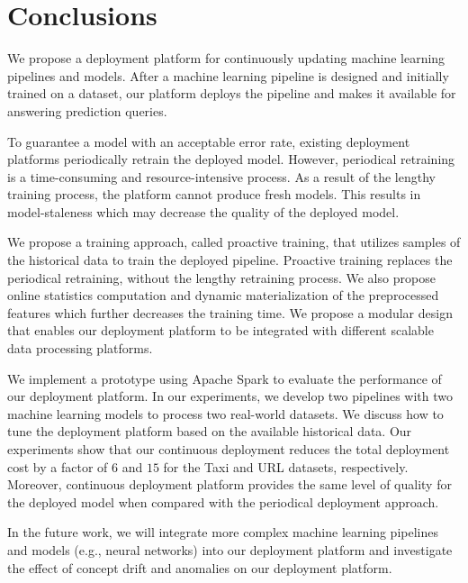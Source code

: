 \section{Conclusions} \label{conclusion}
We propose a deployment platform for continuously updating machine learning pipelines and models.
After a machine learning pipeline is designed and initially trained on a dataset, our platform deploys the pipeline and makes it available for answering prediction queries.

To guarantee a model with an acceptable error rate, existing deployment platforms periodically retrain the deployed model. 
However, periodical retraining is a time-consuming and resource-intensive process.
As a result of the lengthy training process, the platform cannot produce fresh models.
This results in model-staleness which may decrease the quality of the deployed model.

We propose a training approach, called proactive training, that utilizes samples of the historical data to train the deployed pipeline.
Proactive training replaces the periodical retraining,   without the lengthy retraining process.
We also propose online statistics computation and dynamic materialization of the preprocessed features which further decreases the training time.
We propose a modular design that enables our deployment platform to be integrated with different scalable data processing platforms.

We implement a prototype using Apache Spark to evaluate the performance of our deployment platform.
In our experiments, we develop two pipelines with two machine learning models to process two real-world datasets.
We discuss how to tune the deployment platform based on the available historical data.
Our experiments show that our continuous deployment reduces the total deployment cost by a factor of $6$ and $15$ for the Taxi and URL datasets, respectively.
Moreover, continuous deployment platform provides the same level of quality for the deployed model when compared with the periodical deployment approach.

In the future work, we will integrate more complex machine learning pipelines and models (e.g., neural networks) into our deployment platform and investigate the effect of concept drift and anomalies on our deployment platform.
\newline


